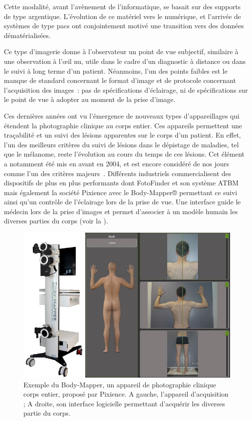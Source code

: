 Cette modalité, avant l’avènement de l’informatique, se basait sur des supports de type argentique. L’évolution de ce matériel vers le numérique, et l’arrivée de systèmes de type \gls{pacs} ont conjointement motivé une transition vers des données dématérialisées.\par

Ce type d’imagerie donne à l’observateur un point de vue subjectif, similaire à une observation à l’œil nu, utile dans le cadre d’un diagnostic à distance ou dans le suivi à long terme d’un patient. Néanmoins, l'un des points faibles est le manque de standard concernant le format d'image et de protocole concernant l'acquisition des images~: pas de spécifications d'éclairage, ni de spécifications sur le point de vue à adopter au moment de la prise d'image.\par

Ces dernières années ont vu l'émergence de nouveaux types d'appareillages qui étendent la photographie clinique au corps entier. Ces appareils permettent une traçabilité et un suivi des lésions apparentes sur le corps d'un patient. En effet, l'un des meilleurs critères du suivi de lésions dans le dépistage de maladies, tel que le mélanome, reste l'évolution au cours du temps de ces lésions. Cet élément a notamment été mis en avant en 2004, et est encore considéré de nos jours comme l'un des critères majeurs~\cite{Abbasi2004,Glazer2017}. Différents industriels commercialisent des dispositifs de plus en plus performants dont FotoFinder et son système ATBM mais également la société Pixience avec le Body-Mapper® permettant ce suivi ainsi qu'un contrôle de l'éclairage lors de la prise de vue. Une interface guide le médecin lors de la prise d'images et permet d'associer à un modèle humain les diverses parties du corps (voir la ).\par

\begin{figure}[H]
\centering
    \includegraphics[width=0.75\linewidth]{contents/chapter_2/resources/example_device_bodymapper.pdf}
    \caption{Exemple du Body-Mapper, un appareil de photographie clinique corps entier, proposé par Pixience. A gauche, l'appareil d'acquisition ; A droite, son interface logicielle permettant d'acquérir les diverses partie du corps.}
    \label{fig:example_device_bodymapper}
\end{figure}\par


